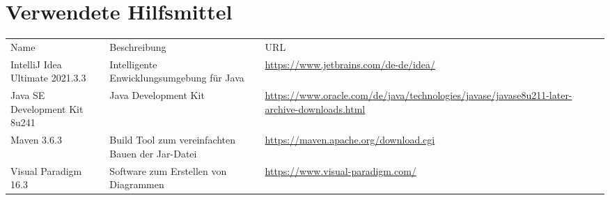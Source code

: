 \chapter{Verwendete Hilfsmittel}\label{ch:verwendete-hilfsmittel}

\begin{table}[!htb]
    \centering
    \begin{tabularx}{\textwidth}{X | X | X}
        \rowcolor{fhfarbe!40}
        Name                            & Beschreibung                                     & URL                                                                                               \\
        IntelliJ Idea Ultimate 2021.3.3 & Intelligente Enwicklungsumgebung für Java        & \url{https://www.jetbrains.com/de-de/idea/}                                                       \\
        Java SE Development Kit 8u241   & Java Development Kit                             & \url{https://www.oracle.com/de/java/technologies/javase/javase8u211-later-archive-downloads.html} \\
        Maven 3.6.3                     & Build Tool zum vereinfachten Bauen der Jar-Datei & \url{https://maven.apache.org/download.cgi}                                                       \\
        Visual Paradigm 16.3            & Software zum Erstellen von Diagrammen            & \url{https://www.visual-paradigm.com/}

    \end{tabularx}\label{tab:hilfsm}
\end{table}
